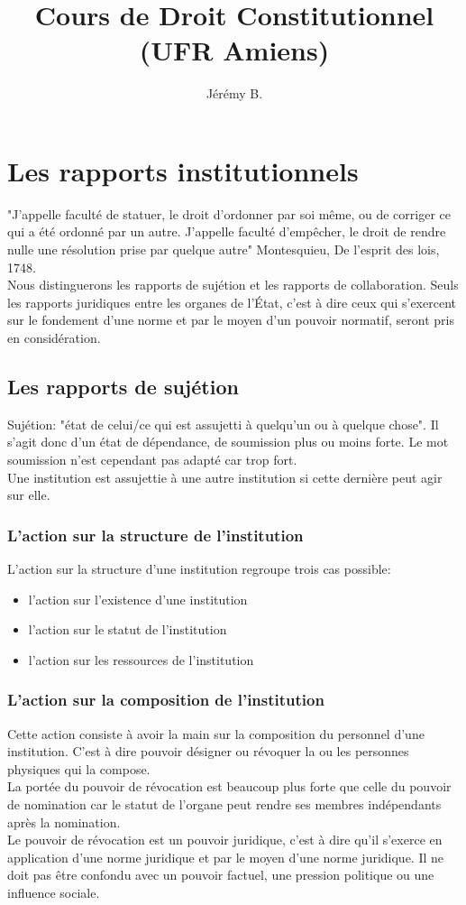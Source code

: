 \documentclass[12pt, a4paper, openany]{book}
\author{Jérémy B.}
\date{}
\title{Cours de Droit Constitutionnel (UFR Amiens)}
\begin{document}
\section{Les rapports institutionnels}

"J'appelle faculté de statuer, le droit d'ordonner par soi même, ou de corriger ce qui a été ordonné par un autre. J'appelle faculté d'empêcher, le droit de rendre nulle une résolution prise par quelque autre" Montesquieu, De l'esprit des lois, 1748. \\
Nous distinguerons les rapports de sujétion et les rapports de collaboration. Seuls les rapports juridiques entre les organes de l'État, c'est à dire ceux qui s'exercent sur le fondement d'une norme et par le moyen d'un pouvoir normatif, seront pris en considération.

\subsection{Les rapports de sujétion}

Sujétion: "état de celui/ce qui est assujetti à quelqu'un ou à quelque chose". Il s'agit donc d'un état de dépendance, de soumission plus ou moins forte. Le mot soumission n'est cependant pas adapté car trop fort. \\
Une institution est assujettie à une autre institution si cette dernière peut agir sur elle.

\subsubsection{L'action sur la structure de l'institution}

L'action sur la structure d'une institution regroupe trois cas possible:
\begin{itemize}
\item l'action sur l'existence d'une institution
\item l'action sur le statut de l'institution
\item l'action sur les ressources de l'institution
\end{itemize}

\subsubsection{L'action sur la composition de l'institution}

Cette action consiste à avoir la main sur la composition du personnel d'une institution. C'est à dire pouvoir désigner ou révoquer la ou les personnes physiques qui la compose. \\
La portée du pouvoir de révocation est beaucoup plus forte que celle du pouvoir de nomination car le statut de l'organe peut rendre ses membres indépendants après la nomination. \\
Le pouvoir de révocation est un pouvoir juridique, c'est à dire qu'il s'exerce en application d'une norme juridique et par le moyen d'une norme juridique. Il ne doit pas être confondu avec un pouvoir factuel, une pression politique ou une influence sociale.
\end{document}
